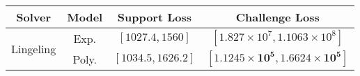 \begin{tabular}{cc|c|c} 
\hline 
 Solver & Model & Support Loss  & Challenge Loss \tabularnewline\hline 
\hline 
\multirow{2}{*}{Lingeling} & Exp. & $\left[1027.4,1560\right]$ & $\left[1.827\times10^{7},1.1063\times10^{8}\right]$ \tabularnewline 
 & Poly. & $\mathbf{\left[1034.5,1626.2\right]}$ & $\mathbf{\left[1.1245\times10^{5},1.6624\times10^{5}\right]}$ \tabularnewline 
\hline 
\end{tabular} 

